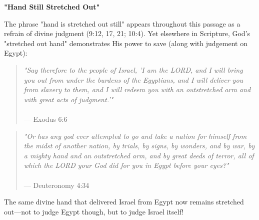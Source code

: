 \documentclass[11pt]{article}
\begin{document}
\newpage
{\large\bfseries "Hand Still Stretched Out"}
\vspace{1em}

The phrase "hand is stretched out still" appears throughout this passage as a refrain of divine judgment (9:12, 17, 21; 10:4). Yet elsewhere in Scripture, God's "stretched out hand" demonstrates His power to save (along with judgement on Egypt):

\begin{quote}
\textit{"Say therefore to the people of Israel, 'I am the LORD, and I will bring you out from under the burdens of the Egyptians, and I will deliver you from slavery to them, and I will redeem you with an outstretched arm and with great acts of judgment.'"}\\\\
\hfill --- Exodus 6:6
\end{quote}

\begin{quote}
\textit{"Or has any god ever attempted to go and take a nation for himself from the midst of another nation, by trials, by signs, by wonders, and by war, by a mighty hand and an outstretched arm, and by great deeds of terror, all of which the LORD your God did for you in Egypt before your eyes?"}\\\\
\hfill --- Deuteronomy 4:34
\end{quote}

The same divine hand that delivered Israel from Egypt now remains stretched out—not to judge Egypt though, but to judge Israel itself!

\begin{biblicaloutline}[Isaiah 9:13-17]

    \begin{versesection}{2em}
    \end{versesection}

\end{biblicaloutline}
\end{document}
